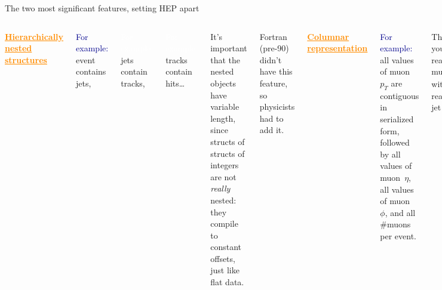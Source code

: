 \documentclass[aspectratio=169]{beamer}
\begin{document}
\begin{frame}{The two most significant features, setting HEP apart}
\vspace{0.5 cm}
\begin{columns}[t]
\textcolor{darkorange}{\bf \underline{\Large Hierarchically nested structures}}

\vspace{0.35 cm}
\textcolor{darkblue}{For example:} event contains jets,

\textcolor{white}{For example:} \hspace{0.5 cm}jets contain tracks,

\textcolor{white}{For example:} \hspace{1 cm}tracks contain hits\ldots

\vspace{0.35 cm}
It's important that the nested objects have variable length, since structs of structs of integers are not {\it really} nested: they compile to constant offsets, just like flat data.

\vspace{0.35 cm}
Fortran (pre-90) didn't have this feature, so physicists had to add it.

\textcolor{darkorange}{\bf \underline{\Large Columnar representation}}

\vspace{0.35 cm}
\textcolor{darkblue}{For example:} all values of muon~$p_T$ are contiguous in serialized form, followed by all values of muon~$\eta$, all values of muon~$\phi$, and all \#muons per event.

\vspace{0.35 cm}
Thus, you can read muon~$p_T$ without reading jet~$p_T$.

\vspace{0.35 cm}
Easy for flat data: it's just a transpose.

\vspace{0.1 cm}
There are several techniques for solving it in general (hot CS topic in early 2000's).
\end{columns}
\end{frame}
\end{document}
